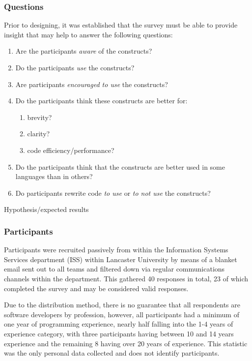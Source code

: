 \documentclass{article}
\begin{document}
        \subsubsection{Questions}
        \label{subsubsec:surveyQuestions}
            Prior to designing, it was established that the survey must be able to provide insight that may help to answer the following questions:
            \begin{enumerate}
                \item Are the participants \emph{aware} of the constructs?
                \item Do the participants \emph{use} the constructs?
                \item Are participants \emph{encouraged to use} the constructs?
                \item Do the participants think these constructs are better for:
                \begin{enumerate}
                    \item brevity?
                    \item clarity?
                    \item code efficiency/performance?
                \end{enumerate}  
                \item Do the participants think that the constructs are better used in some languages than in others?
                \item Do participants rewrite code \emph{to use} or \emph{to not use} the constructs?
            \end{enumerate}
            
            Hypothesis/expected results
        \subsubsection{Participants}
            Participants were recruited passively from within the Information Systems Services department (ISS) within Lancaster University by means of a blanket email sent out to all teams and filtered down via regular communications channels within the department. This gathered 40 responses in total, 23 of which completed the survey and may be considered valid responses.
            
            Due to the distribution method, there is no guarantee that all respondents are software developers by profession, however, all participants had a minimum of one year of programming experience, nearly half falling into the 1-4 years of experience category, with three participants having between 10 and 14 years experience and the remaining 8 having over 20 years of experience. This statistic was the only personal data collected and does not identify participants.
\end{document}
